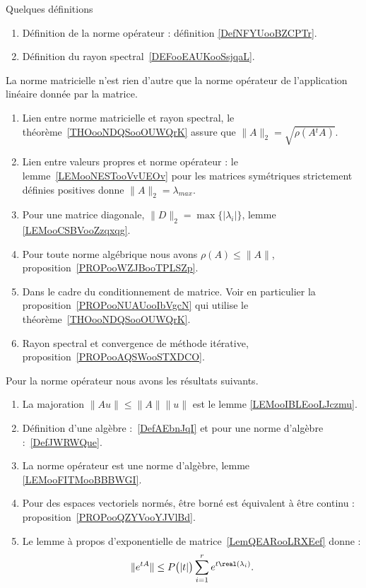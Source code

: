
     \label{THEMEooOJJFooWMSAtL}

Quelques définitions
\begin{enumerate}
	\item
	      Définition de la norme opérateur : définition \ref{DefNFYUooBZCPTr}.
	\item
	      Définition du rayon spectral~\ref{DEFooEAUKooSsjqaL}.
\end{enumerate}

La norme matricielle n'est rien d'autre que la norme opérateur de l'application linéaire donnée par la matrice.

\begin{enumerate}
	\item
	      Lien entre norme matricielle et rayon spectral, le théorème~\ref{THOooNDQSooOUWQrK} assure que \( \|A\|_2=\sqrt{\rho(A{^t}A)}\).
	\item
	      Lien entre valeurs propres et norme opérateur : le lemme~\ref{LEMooNESTooVvUEOv} pour les matrices symétriques strictement définies positives donne \( \| A \|_2=\lambda_{max}\).
	\item
	      Pour une matrice diagonale, \( \| D \|_2=\max\{ | \lambda_i | \}\), lemme \ref{LEMooCSBVooZzqxqg}.
	\item
	      Pour toute norme algébrique nous avons \( \rho(A)\leq \| A \|\), proposition~\ref{PROPooWZJBooTPLSZp}.
	\item
	      Dans le cadre du conditionnement de matrice. Voir en particulier la proposition~\ref{PROPooNUAUooIbVgcN} qui utilise le théorème~\ref{THOooNDQSooOUWQrK}.
	\item
	      Rayon spectral et convergence de méthode itérative, proposition~\ref{PROPooAQSWooSTXDCO}.
\end{enumerate}

Pour la norme opérateur nous avons les résultats suivants.

\begin{enumerate}
	\item
	      La majoration \( \| Au \|\leq \| A \|\| u \|\) est le lemme \ref{LEMooIBLEooLJczmu}.
	\item
	      Définition d'une algèbre :~\ref{DefAEbnJqI} et pour une norme d'algèbre :~\ref{DefJWRWQue}.
	\item
	      La norme opérateur est une norme d'algèbre, lemme \ref{LEMooFITMooBBBWGI}.
	\item
	      Pour des espaces vectoriels normés, être borné est équivalent à être continu : proposition~\ref{PROPooQZYVooYJVlBd}.
	\item
	      Le lemme à propos d'exponentielle de matrice~\ref{LemQEARooLRXEef} donne :
	      \begin{equation*}
		      \|  e^{tA} \|\leq P\big( | t | \big)\sum_{i=1}^r e^{t\real(\lambda_i)}.
	      \end{equation*}
\end{enumerate}

